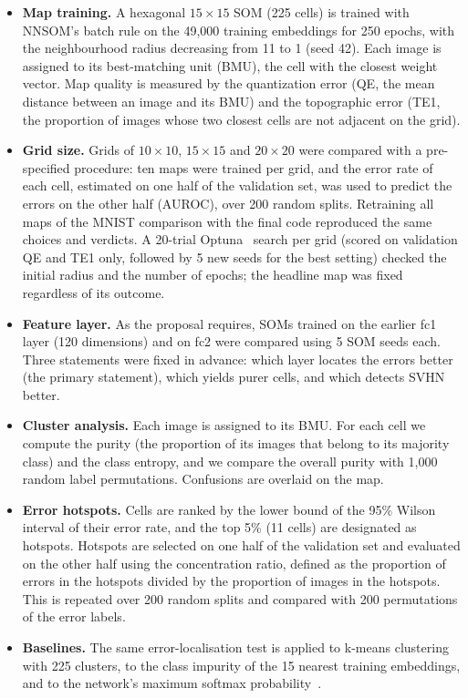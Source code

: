 \documentclass{scrartcl}
\begin{document}
\begin{itemize}
  \item \textbf{Map training.} A hexagonal $15\times15$ SOM (225 cells) is trained with NNSOM's batch rule on the 49,000 training embeddings for 250 epochs, with the neighbourhood radius decreasing from 11 to 1 (seed 42). Each image is assigned to its best-matching unit (BMU), the cell with the closest weight vector. Map quality is measured by the quantization error (QE, the mean distance between an image and its BMU) and the topographic error (TE1, the proportion of images whose two closest cells are not adjacent on the grid).
  \item \textbf{Grid size.} Grids of $10\times10$, $15\times15$ and $20\times20$ were compared with a pre-specified procedure: ten maps were trained per grid, and the error rate of each cell, estimated on one half of the validation set, was used to predict the errors on the other half (AUROC), over 200 random splits. Retraining all maps of the MNIST comparison with the final code reproduced the same choices and verdicts. A 20-trial Optuna~\cite{akiba2019optuna} search per grid (scored on validation QE and TE1 only, followed by 5 new seeds for the best setting) checked the initial radius and the number of epochs; the headline map was fixed regardless of its outcome.
  \item \textbf{Feature layer.} As the proposal requires, SOMs trained on the earlier fc1 layer (120 dimensions) and on fc2 were compared using 5 SOM seeds each. Three statements were fixed in advance: which layer locates the errors better (the primary statement), which yields purer cells, and which detects SVHN better.
  \item \textbf{Cluster analysis.} Each image is assigned to its BMU. For each cell we compute the purity (the proportion of its images that belong to its majority class) and the class entropy, and we compare the overall purity with 1,000 random label permutations. Confusions are overlaid on the map.
  \item \textbf{Error hotspots.} Cells are ranked by the lower bound of the 95\% Wilson interval of their error rate, and the top 5\% (11 cells) are designated as hotspots. Hotspots are selected on one half of the validation set and evaluated on the other half using the concentration ratio, defined as the proportion of errors in the hotspots divided by the proportion of images in the hotspots. This is repeated over 200 random splits and compared with 200 permutations of the error labels.
  \item \textbf{Baselines.} The same error-localisation test is applied to k-means clustering with 225 clusters, to the class impurity of the 15 nearest training embeddings, and to the network's maximum softmax probability~\cite{hendrycks2017baseline}.
\end{itemize}
\end{document}
